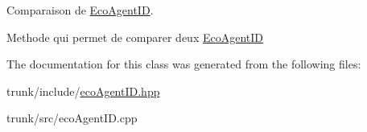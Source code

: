 Comparaison de \hyperlink{classEcoAgentID}{EcoAgentID}. 

Methode qui permet de comparer deux \hyperlink{classEcoAgentID}{EcoAgentID} 

The documentation for this class was generated from the following files:\begin{CompactItemize}
\item 
trunk/include/\hyperlink{ecoAgentID_8hpp}{ecoAgentID.hpp}\item 
trunk/src/ecoAgentID.cpp\end{CompactItemize}
